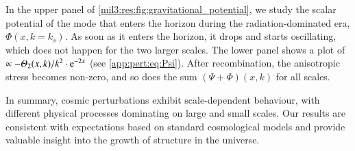 
In the upper panel of \cref{mil3:res:fig:gravitational_potential}, we study the scalar potential of the mode that enters the horizon during the radiation-dominated era, $\Phi(x,k\!=\!k_s)$. As soon as it enters the horizon, it drops and starts oscillating, which does not happen for the two larger scales. The lower panel shows a plot of $\propto -\Theta_2(x, k)/k^2\cdot \eu[-2x]$ (see \cref{app:pert:eq:Psi}). After recombination, the anisotropic stress becomes non-zero, and so does the sum $\left(\Psi + \Phi\right)(x,k)$ for all scales.



In summary, cosmic perturbations exhibit scale-dependent behaviour, with different physical processes dominating on large and small scales. Our results are consistent with expectations based on standard cosmological models and provide valuable insight into the growth of structure in the universe.


